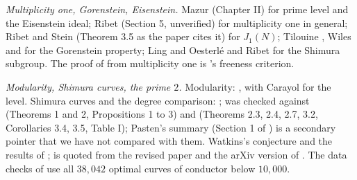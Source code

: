 \emph{Multiplicity one, Gorenstein, Eisenstein.} Mazur \cite{Mazur77} (Chapter II) for prime level and the Eisenstein ideal; Ribet \cite{Ribet90} (Section 5, unverified) for multiplicity one in general;
Ribet and Stein \cite{RibetStein} (Theorem 3.5 as the paper cites it) for $J_1(N)$; Tilouine \cite{Tilouine97}, Wiles \cite[Chapter 2]{Wiles95} and \cite[Section 4]{DDT} for the Gorenstein property; Ling and Oesterl\'e
\cite{LingOesterle} and Ribet \cite{Ribet88} for the Shimura subgroup. The proof of  from multiplicity one is 's freeness criterion.

\emph{Modularity, Shimura curves, the prime $2$.} Modularity: \cite{Wiles95,TaylorWiles,BCDT}, with Carayol \cite{Carayol86} for the level. Shimura curves and the degree comparison: \cite{Ribet90,RibetTakahashi97,Takahashi01,Pasten};  was checked against \cite{RibetTakahashi97} (Theorems 1 and 2, Propositions 1 to 3) and \cite{Takahashi01}
(Theorems 2.3, 2.4, 2.7, 3.2, Corollaries 3.4, 3.5, Table I); Pasten's summary (Section 1 of \cite{Pasten}) is a secondary pointer that we have not compared with them. Watkins's conjecture \cite{Watkins02} and the results of \cite{Dummigan06,CalegariEmerton09,Yazdani11,CaroPasten22,HatleyKundu,BKP};  is quoted from the revised paper and the arXiv version of \cite{CalegariEmerton09}. The data checks of
 use all $38{,}042$ optimal curves of conductor below $10{,}000$.
